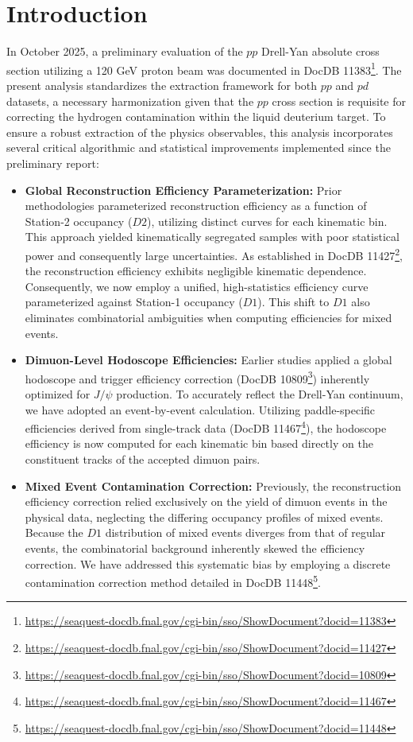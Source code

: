 \documentclass[11pt]{article}
\begin{document}

\section{Introduction}
\label{sec:introduction}
In October 2025, a preliminary evaluation of the $pp$ Drell-Yan absolute cross section utilizing a 120 GeV proton beam was documented in DocDB 11383\footnote{\url{https://seaquest-docdb.fnal.gov/cgi-bin/sso/ShowDocument?docid=11383}}. The present analysis standardizes the extraction framework for both $pp$ and $pd$ datasets, a necessary harmonization given that the $pp$ cross section is requisite for correcting the hydrogen contamination within the liquid deuterium target. To ensure a robust extraction of the physics observables, this analysis incorporates several critical algorithmic and statistical improvements implemented since the preliminary report:

\begin{itemize}
    \item \textbf{Global Reconstruction Efficiency Parameterization:} Prior methodologies parameterized reconstruction efficiency as a function of Station-2 occupancy ($D2$), utilizing distinct curves for each kinematic bin. This approach yielded kinematically segregated samples with poor statistical power and consequently large uncertainties. As established in DocDB 11427\footnote{\url{https://seaquest-docdb.fnal.gov/cgi-bin/sso/ShowDocument?docid=11427}}, the reconstruction efficiency exhibits negligible kinematic dependence. Consequently, we now employ a unified, high-statistics efficiency curve parameterized against Station-1 occupancy ($D1$). This shift to $D1$ also eliminates combinatorial ambiguities when computing efficiencies for mixed events.
    \item \textbf{Dimuon-Level Hodoscope Efficiencies:} Earlier studies applied a global hodoscope and trigger efficiency correction (DocDB 10809\footnote{\url{https://seaquest-docdb.fnal.gov/cgi-bin/sso/ShowDocument?docid=10809}}) inherently optimized for $J/\psi$ production. To accurately reflect the Drell-Yan continuum, we have adopted an event-by-event calculation. Utilizing paddle-specific efficiencies derived from single-track data (DocDB 11467\footnote{\url{https://seaquest-docdb.fnal.gov/cgi-bin/sso/ShowDocument?docid=11467}}), the hodoscope efficiency is now computed for each kinematic bin based directly on the constituent tracks of the accepted dimuon pairs.
    \item \textbf{Mixed Event Contamination Correction:} Previously, the reconstruction efficiency correction relied exclusively on the yield of dimuon events in the physical data, neglecting the differing occupancy profiles of mixed events. Because the $D1$ distribution of mixed events diverges from that of regular events, the combinatorial background inherently skewed the efficiency correction. We have addressed this systematic bias by employing a discrete contamination correction method detailed in DocDB 11448\footnote{\url{https://seaquest-docdb.fnal.gov/cgi-bin/sso/ShowDocument?docid=11448}}.
\end{itemize}
\end{document}
